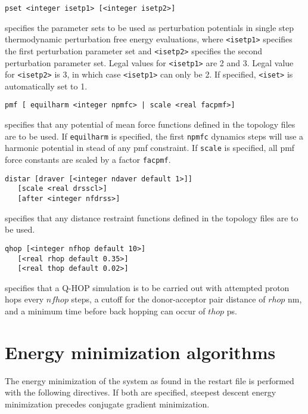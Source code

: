 \begin{description}
\item
\begin{verbatim}
pset <integer isetp1> [<integer isetp2>]
\end{verbatim}
specifies the parameter sets to be used as perturbation potentials
in single step thermodynamic perturbation free energy evaluations,
where \verb+<isetp1>+ specifies the first perturbation parameter set and
\verb+<isetp2>+ specifies the second perturbation parameter set. Legal
values for \verb+<isetp1>+ are 2 and 3. Legal value for \verb+<isetp2>+ is
3, in which case \verb+<isetp1>+ can only be 2. If specified, \verb+<iset>+
is automatically set to 1.

\item
\begin{verbatim}
pmf [ equilharm <integer npmfc> | scale <real facpmf>]
\end{verbatim}
specifies that any potential of mean force functions defined in the
topology files are to be used. If \verb+equilharm+ is specified, the
first \verb+npmfc+ dynamics steps will use a harmonic potential
in stead of any pmf constraint. If \verb+scale+ is specified, all
pmf force constants are scaled by a factor \verb+facpmf+.

\item
\begin{verbatim}
distar [draver [<integer ndaver default 1>]] 
   [scale <real drsscl>]
   [after <integer nfdrss>]
\end{verbatim}
specifies that any distance restraint functions defined in the
topology files are to be used. 


\item
\begin{verbatim}
qhop [<integer nfhop default 10>] 
   [<real rhop default 0.35>]
   [<real thop default 0.02>]
\end{verbatim}
specifies that a Q-HOP simulation is to be carried out with attempted
proton hops every $nfhop$ steps, a cutoff for the donor-acceptor pair
distance of $rhop$ nm, and a minimum time before back hopping can occur
of $thop$ ps.


\end{description}

\section{Energy minimization algorithms}
The energy minimization of the system as found in the restart file 
is performed with the following directives. If both are specified,
steepest descent energy minimization precedes conjugate gradient 
minimization.

